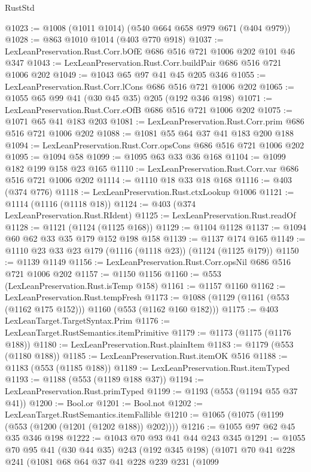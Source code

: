 \begin{lexlean}{RustStd}
\begin{coremodule}
@1023 := @1008 (@1011 @1014) (@540 @664 @658 @979 @671 (@404 @979))
@1028 := @863 @1010 @1014 (@403 @770 @918)
@1037 := LexLeanPreservation.Rust.Corr.bOfE @686 @516 @721 @1006 @202 @101 @46 @347
@1043 := LexLeanPreservation.Rust.Corr.buildPair @686 @516 @721 @1006 @202
@1049 := @1043 @65 @97 @41 @45 @205 @346
@1055 := LexLeanPreservation.Rust.Corr.lCons @686 @516 @721 @1006 @202
@1065 := @1055 @65 @99 @41 (@30 @45 @35) @205 (@192 @346 @198)
@1071 := LexLeanPreservation.Rust.Corr.eOfB @686 @516 @721 @1006 @202
@1075 := @1071 @65 @41 @183 @203
@1081 := LexLeanPreservation.Rust.Corr.prim @686 @516 @721 @1006 @202
@1088 := @1081 @55 @64 @37 @41 @183 @200 @188
@1094 := LexLeanPreservation.Rust.Corr.opsCons @686 @516 @721 @1006 @202
@1095 := @1094 @58
@1099 := @1095 @63 @33 @36 @168
@1104 := @1099 @182 @199 @158 @23 @165
@1110 := LexLeanPreservation.Rust.Corr.var @686 @516 @721 @1006 @202
@1114 := @1110 @18 @33 @18 @168
@1116 := @403 (@374 @776)
@1118 := LexLeanPreservation.Rust.ctxLookup @1006
@1121 := @1114 (@1116 (@1118 @18))
@1124 := @403 (@374 LexLeanPreservation.Rust.RIdent)
@1125 := LexLeanPreservation.Rust.readOf
@1128 := @1121 (@1124 (@1125 @168))
@1129 := @1104 @1128
@1137 := @1094 @60 @62 @33 @35 @179 @152 @198 @158
@1139 := @1137 @174 @165
@1149 := @1110 @23 @33 @23 @179 (@1116 (@1118 @23)) (@1124 (@1125 @179))
@1150 := @1139 @1149
@1156 := LexLeanPreservation.Rust.Corr.opsNil @686 @516 @721 @1006 @202
@1157 := @1150 @1156
@1160 := @553 (LexLeanPreservation.Rust.isTemp @158)
@1161 := @1157 @1160
@1162 := LexLeanPreservation.Rust.tempFresh
@1173 := @1088 (@1129 (@1161 (@553 (@1162 @175 @152))) @1160 (@553 (@1162 @160 @182)))
@1175 := @403 LexLeanTarget.TargetSyntax.Prim
@1176 := LexLeanTarget.RustSemantics.itemPrimitive
@1179 := @1173 (@1175 (@1176 @188))
@1180 := LexLeanPreservation.Rust.plainItem
@1183 := @1179 (@553 (@1180 @188))
@1185 := LexLeanPreservation.Rust.itemOK @516
@1188 := @1183 (@553 (@1185 @188))
@1189 := LexLeanPreservation.Rust.itemTyped
@1193 := @1188 (@553 (@1189 @188 @37))
@1194 := LexLeanPreservation.Rust.primTyped
@1199 := @1193 (@553 (@1194 @55 @37 @41))
@1200 := Bool.or
@1201 := Bool.not
@1202 := LexLeanTarget.RustSemantics.itemFallible
@1210 := @1065 (@1075 (@1199 (@553 (@1200 (@1201 (@1202 @188)) @202))))
@1216 := @1055 @97 @62 @45 @35 @346 @198
@1222 := @1043 @70 @93 @41 @44 @243 @345
@1291 := @1055
    @70
    @95
    @41
    (@30 @44 @35)
    @243
    (@192 @345 @198)
    (@1071
      @70
      @41
      @228
      @241
      (@1081
        @68
        @64
        @37
        @41
        @228
        @239
        @231
        (@1099

\end{coremodule}
\end{lexlean}
